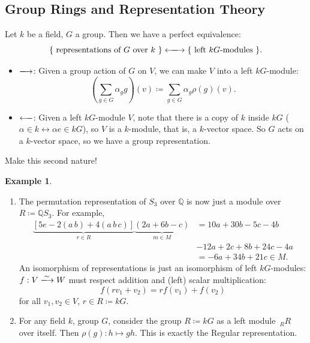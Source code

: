 \documentclass[12pt]{article}
\newcommand{\q}{\mathbb{Q}}
\theoremstyle{definition}
\newtheorem{example}{Example}[section]
\begin{document}
\subsection{Group Rings and Representation Theory}
Let $k$ be a field, $G$ a group. Then we have a perfect equivalence:
\begin{equation}
    \{\text{ representations of $G$ over $k$ }\}\xlongleftrightarrow{}\{\text{ left $kG$-modules }\}.
\end{equation}
\begin{itemize}
    \item $\xlongrightarrow{}$: Given a group action of $G$ on $V$, we can make $V$ into a left $kG$-module:
    \begin{equation}
        \left(\sum\limits_{g\in G}\alpha_gg\right)(v)\coloneqq \sum\limits_{g\in G}\alpha_g\rho(g)(v).
    \end{equation}
    \item $\xlongleftarrow{}$: Given a left $kG$-module $V$, note that there is a copy of $k$ inside $kG$ ($\alpha\in k\leftrightarrow\alpha e\in kG$), so $V$ is a $k$-module, that is, a $k$-vector space. So $G$ acts on a $k$-vector space, so we have a group representation.
\end{itemize}
Make this second nature! 
\begin{example}
    \noindent
    \begin{enumerate}
        \item The permutation representation of $S_3$ over $\q$ is now just a module over $R\coloneqq \q S_3$. For example,
        \begin{equation}
            \begin{split}
                \underbrace{\left[5e-2(a\,b)+4(a\,b\,c)\right]}_{r\in R}\underbrace{(2a+6b-c)}_{m\in M}&=10a+30b-5c-4b\\
                &-12a+2c+8b+24c-4a\\
                &=\boxed{-6a+34b+21c}\in M.
            \end{split}
        \end{equation}
        An isomorphism of representations is just an isomorphism of left $kG$-modules: $f:V\xlongrightarrow{\sim}W$ must respect addition and (left) scalar multiplication: 
        \begin{equation}
            f(rv_1+v_2)=rf(v_1)+f(v_2)
        \end{equation}
        for all $v_1,v_2\in V$, $r\in R\coloneqq kG$.
        \item For any field $k$, group $G$, consider the group $R\coloneqq kG$ as a left module $\,_RR$ over itself. Then $\rho(g):h\mapsto gh$. This is exactly the Regular representation.
    \end{enumerate}
\end{example}
\end{document}
